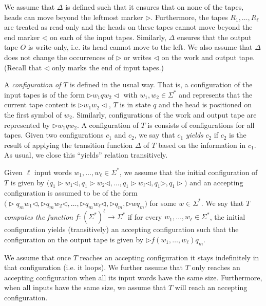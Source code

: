 We assume that $\Delta$ is defined such that it ensures that on none of the tapes, heads can move beyond 
the leftmost marker $\rhd$. Furthermore, the tapes $R_1,\ldots,R_\ell$ are treated as read-only and the heads 
on these tapes cannot move beyond the end marker $\lhd$ on each of the input tapes. Similarly, $\Delta$ ensures that the output tape $O$ 
is write-only, i.e. its head cannot move to the left.  We also assume that $\Delta$ does not change the 
occurrences of $\rhd$ or writes $\lhd$ on the work and output tape. (Recall that $\lhd$ only marks the end
of input tapes.)

A \textit{configuration of} $T$ is defined in the usual way. That is, a configuration of the input tapes is of the form
$\rhd w_1qw_2\lhd$ with $w_1,w_2\in\Sigma^*$ and represents that the current tape content is 
$\rhd w_1w_2\lhd$, $T$ is in state $q$ and the head is positioned on the first symbol of $w_2$. 
Similarly, configurations of the work and output tape are represented by $\rhd w_1qw_2$. 
A configuration of $T$ is consists of configurations for all tapes. Given two configurations 
$c_1$ and $c_2$, we say that $c_1$ \textit{yields} $c_2$ if $c_2$ is the result of applying the transition 
function $\Delta$ of $T$ based on the information in $c_1$. As usual, we close this ``yields'' relation 
transitively.

Given $\ell$ input words $w_1,\ldots,w_\ell\in\Sigma^*$, we assume that the initial configuration of 
$T$ is given by
$\bigl(q_1\rhd  w_1\lhd,q_1\rhd w_2\lhd,\ldots, q_1\rhd w_\ell\lhd,q_1\rhd, q_1\rhd \bigr)$ and an 
accepting configuration is assumed to be of the form 
$\bigl(\rhd q_m w_1\lhd,\rhd q_m w_2\lhd,\ldots, \rhd q_m w_\ell\lhd,\rhd q_m,\rhd w q_m\bigr)$ for some
$w\in\Sigma^*$. We say that $T$ \textit{computes the function} $f:(\Sigma^*)^{\ell}\to\Sigma^*$ if for every
$w_1,\ldots,w_\ell\in\Sigma^*$, the initial configuration yields (transitively) an accepting 
configuration such that the configuration on the output tape is
given by $\rhd f(w_1,\ldots,w_\ell) q_m$. 

We assume that once $T$ reaches an accepting configuration it stays indefinitely in that configuration 
(i.e. it loops). We further assume that $T$ only reaches an accepting configuration when all its input
words have the same size. Furthermore, when all inputs have the same size, we assume that $T$ will reach an accepting 
configuration. 


